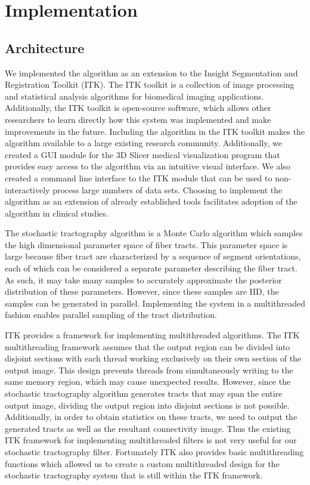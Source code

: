 \chapter{Implementation}
\section{Architecture}
We implemented the algorithm as an extension to the Insight Segmentation and Registration Toolkit (ITK).  The ITK toolkit is a collection of image processing and statistical analysis algorithms for biomedical imaging applications.  Additionally, the ITK toolkit is open-source software, which allows other researchers to learn directly how this system was implemented and make improvements in the future.  Including the algorithm in the ITK toolkit makes the algorithm available to a large existing research community.  Additionally, we created a GUI module for the 3D Slicer medical visualization program that provides easy access to the algorithm via an intuitive visual interface.  We also created a command line interface to the ITK module that can be used to non-interactively process large numbers of data sets.  Choosing to implement the algorithm as an extension of already established tools facilitates adoption of the algorithm in clinical studies.

The stochastic tractography algorithm is a Monte Carlo algorithm which samples the high dimensional parameter space of fiber tracts.  This parameter space is large because fiber tract are characterized by a sequence of segment orientations, each of which can be considered a separate parameter describing the fiber tract.  As such, it may take many samples to accurately approximate the posterior distribution of these parameters.  However, since these samples are IID, the samples can be generated in parallel.  Implementing the system in a multithreaded fashion enables parallel sampling of the tract distribution.

ITK  provides a framework for implementing multithreaded algorithms.  The ITK multithreading framework assumes that the output region can be divided into disjoint sections with each thread working exclusively on their own section of the output image.  This design prevents threads from simultaneously writing to the same memory region, which may cause unexpected results.  However, since the stochastic tractography algorithm generates tracts that may span the entire output image, dividing the output region into disjoint sections is not possible.  Additionally, in order to obtain statistics on these tracts, we need to output the generated tracts as well as the resultant connectivity image.  Thus the existing ITK framework for implementing multithreaded filters is not very useful for our stochastic tractography filter.  Fortunately ITK also provides basic multithreading functions which allowed us to create a custom multithreaded design for the stochastic tractography system that is still within the ITK framework. 

